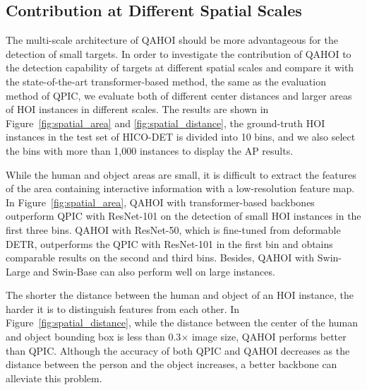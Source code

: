 \documentclass[10pt,twocolumn,letterpaper]{article}
\begin{document}
\subsection{Contribution at Different Spatial Scales}
The multi-scale architecture of QAHOI should be more advantageous for the detection of small targets. 
In order to investigate the contribution of QAHOI to the detection capability of targets at different spatial scales and compare it with the state-of-the-art transformer-based method, the same as the evaluation method of QPIC, we evaluate both of different center distances and larger areas of HOI instances in different scales.
The results are shown in Figure~\ref{fig:spatial_area} and \ref{fig:spatial_distance}, the ground-truth HOI instances in the test set of HICO-DET is divided into 10 bins, and we also select the bins with more than 1,000 instances to display the AP results.

While the human and object areas are small, it is difficult to extract the features of the area containing interactive information with a low-resolution feature map.
In Figure~\ref{fig:spatial_area}, QAHOI with transformer-based backbones outperform QPIC with ResNet-101 on the detection of small HOI instances in the first three bins. 
QAHOI with ResNet-50, which is fine-tuned from deformable DETR, outperforms the QPIC with ResNet-101 in the first bin and obtains comparable results on the second and third bins.
Besides, QAHOI with Swin-Large and Swin-Base can also perform well on large instances.

The shorter the distance between the human and object of an HOI instance, the harder it is to distinguish features from each other.
In Figure~\ref{fig:spatial_distance}, while the distance between the center of the human and object bounding box is less than 0.3$\times$ image size, QAHOI performs better than QPIC. 
Although the accuracy of both QPIC and QAHOI decreases as the distance between the person and the object increases, a better backbone can alleviate this problem.
\end{document}
